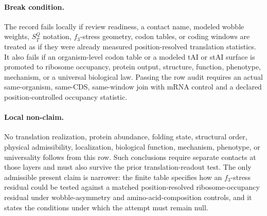 \paragraph{Break condition.}
The record fails locally if review readiness, a contact name, modeled wobble weights, $S^Q_T$ notation, $f_3$-stress geometry, codon tables, or coding windows are treated as if they were already measured position-resolved translation statistics. It also fails if an organism-level codon table or a modeled tAI or stAI surface is promoted to ribosome occupancy, protein output, structure, function, phenotype, mechanism, or a universal biological law. Passing the row audit requires an actual same-organism, same-CDS, same-window join with mRNA control and a declared position-controlled occupancy statistic.

\paragraph{Local non-claim.}
No translation realization, protein abundance, folding state, structural order, physical admissibility, localization, biological function, mechanism, phenotype, or universality follows from this row. Such conclusions require separate contacts at those layers and must also survive the prior translation-readout test. The only admissible present claim is narrower: the finite table specifies how an $f_3$-stress residual could be tested against a matched position-resolved ribosome-occupancy residual under wobble-asymmetry and amino-acid-composition controls, and it states the conditions under which the attempt must remain null.

